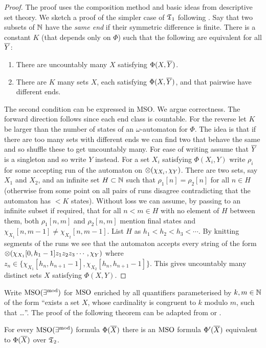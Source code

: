 \begin{proof}
The proof uses the composition method and basic ideas from descriptive set theory. We sketch a proof of the simpler case of $\mathfrak{T}_1$ following \cite{KuLo08JSL}. Say that two subsets of $\mathbb{N}$
have the {\em same end} if their symmetric difference is finite.  There is a constant $K$ (that depends only on $\Phi$) such that the following are equivalent for all $\mbox{$\overline {Y}$}$:

\begin{enumerate}
\item There are uncountably many $X$ satisfying $\Phi(X,\mbox{$\overline {Y}$})$.
\item There are $K$ many sets $X$, each satisfying $\Phi(X,\mbox{$\overline {Y}$})$, and that pairwise have different ends.
\end{enumerate}
The second condition can be expressed in MSO. We argue correctness.
The forward direction follows since each end class is countable. For the reverse let $K$ be larger than the number of states of an $\omega$-automaton for $\Phi$. The idea is that if there are too many sets with different ends we can find two that behave the same and so shuffle these to get uncountably many.  For ease of writing assume that $\mbox{$\overline {Y}$}$ is a singleton and so write $Y$ instead. For a set $X_i$ satisfying $\Phi(X_i,Y)$ write
$\rho_i$ for some accepting run of the automaton on 
$\otimes(\chi_{X_i},\chi_Y)$. 
 There are two sets, say $X_1$ and $X_2$, and an infinite set $H \subset \mathbb{N}$ such that $\rho_1[n] = \rho_2[n]$ for all $n \in H$ (otherwise from some point on all pairs of runs disagree contradicting that the automaton has $<K$ states). Without loss we can assume, by passing to an infinite subset if required, that for all $n < m \in H$ with no element of $H$ between them, 
both $\rho_1[n,m]$ and $\rho_2[n,m]$ mention final states and $\chi_{X_1}[n,m-1] \neq \chi_{X_2}[n,m-1]$. List $H$ as $h_1 < h_2 < h_3 < \cdots$.
By knitting segments of the runs we see that the automaton accepts every string of the form $\otimes(\chi_{X_1}[0,h_1-1]z_1z_2z_3\cdots,\chi_Y)$ where $z_n \in \{\chi_{X_1}[h_n,h_{n+1}-1] , \chi_{X_2}[h_n,h_{n+1}-1]\}$.
This gives uncountably many distinct sets $X$ satisfying $\Phi(X,Y)$.
\end{proof}

Write $\mbox{\rm {MSO}}(\exists^{\rm{mod}})$ for $\mbox{\rm MSO}$ enriched by all quantifiers parameterised by $k,m \in \mathbb{N}$ of the form ``exists a set $X$, whose cardinality is congruent to $k$ modulo $m$, such that \dots''. The proof of the following theorem can be adapted from \cite{KRS04} or \cite{KuLo08JSL}.
\begin{theorem} 
For every $\mbox{\rm {MSO}}(\exists^{\rm{mod}})$ formula $\Phi(\mbox{$\overline {X}$})$ there is an $\mbox{\rm MSO}$ formula
$\Phi'(\mbox{$\overline {X}$})$ equivalent to $\Phi(\mbox{$\overline {X}$})$ over $\mathfrak{T}_2$.
\end{theorem}


